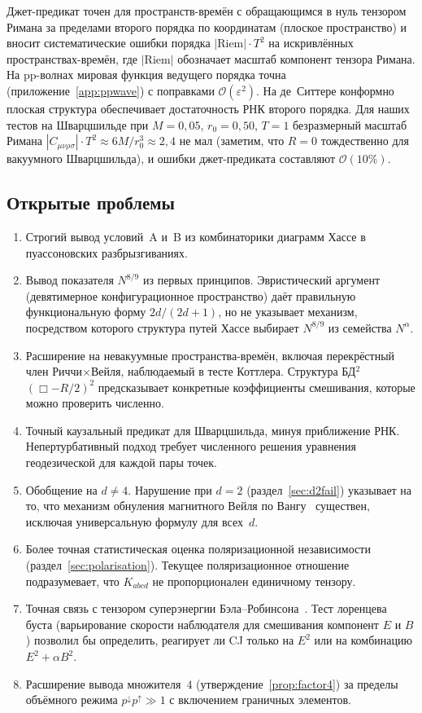 \documentclass[12pt,a4paper]{article}
\theoremstyle{plain}
\theoremstyle{definition}
\theoremstyle{remark}
\newcommand{\order}{\mathcal{O}}
\begin{document}
Джет-предикат точен для пространств-времён с обращающимся
в нуль тензором Римана за пределами второго порядка по
координатам (плоское пространство) и вносит систематические
ошибки порядка $|\mathrm{Riem}| \cdot T^2$ на искривлённых
пространствах-времён, где $|\mathrm{Riem}|$ обозначает масштаб
компонент тензора Римана.  На pp-волнах мировая функция
ведущего порядка точна (приложение~\ref{app:ppwave}) с
поправками $\order(\varepsilon^2)$.  На де~Ситтере конформно
плоская структура обеспечивает достаточность РНК второго
порядка.  Для наших тестов на Шварцшильде при $M = 0{,}05$,
$r_0 = 0{,}50$, $T = 1$ безразмерный масштаб Римана
$|C_{\mu\nu\rho\sigma}| \cdot T^2 \approx 6M/r_0^3 \approx 2{,}4$
не мал (заметим, что $R = 0$ тождественно для вакуумного
Шварцшильда), и ошибки джет-предиката составляют
$\order(10\%)$.

\subsection{Открытые проблемы}
\label{sec:open}

\begin{enumerate}[(1)]
\item Строгий вывод условий~A и~B из комбинаторики диаграмм
  Хассе в пуассоновских разбрызгиваниях.
\item Вывод показателя $N^{8/9}$ из первых принципов.
  Эвристический аргумент (девятимерное конфигурационное
  пространство) даёт правильную функциональную форму
  $2d/(2d+1)$, но не указывает механизм, посредством
  которого структура путей Хассе выбирает $N^{8/9}$ из
  семейства $N^\alpha$.
\item Расширение на невакуумные пространства-времён,
  включая перекрёстный член Риччи$\times$Вейля, наблюдаемый
  в тесте Коттлера.  Структура БД${}^2$
  $(\Box - R/2)^2$ предсказывает конкретные коэффициенты
  смешивания, которые можно проверить численно.
\item Точный каузальный предикат для Шварцшильда, минуя
  приближение РНК.  Непертурбативный подход требует
  численного решения уравнения геодезической для каждой
  пары точек.
\item Обобщение на $d \neq 4$.  Нарушение при $d = 2$
  (раздел~\ref{sec:d2fail}) указывает на то, что механизм
  обнуления магнитного Вейля по Вангу~\cite{Wang:2019}
  существен, исключая универсальную формулу для всех~$d$.
\item Более точная статистическая оценка поляризационной
  независимости (раздел~\ref{sec:polarisation}).
  Текущее поляризационное отношение подразумевает, что
  $K_{abcd}$ не пропорционален единичному тензору.
\item Точная связь с тензором суперэнергии
  Бэла--Робинсона~\cite{Senovilla:2000}.  Тест лоренцева
  буста (варьирование скорости наблюдателя для смешивания
  компонент $E$ и $B$) позволил бы определить, реагирует ли
  CJ только на $E^2$ или на комбинацию
  $E^2 + \alpha B^2$.
\item Расширение вывода множителя~$4$
  (утверждение~\ref{prop:factor4}) за пределы объёмного
  режима $p^{\downarrow} p^{\uparrow} \gg 1$ с включением
  граничных элементов.
\end{enumerate}
\end{document}
